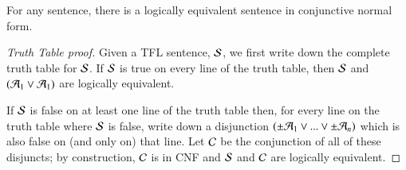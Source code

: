 \begin{theorem}
    For any sentence, there is a logically equivalent sentence in conjunctive normal form.
\end{theorem}
\begin{proof}[Truth Table proof]
    Given a TFL sentence, $\mathcal{S}$, we first write down the complete truth table for $\mathcal{S}$. If $\mathcal{S}$ is true on every line of the truth table, then $\mathcal{S}$ and $(\mathcal{A}_1\vee\mathcal{A}_1)$ are logically equivalent.

    If $\mathcal{S}$ is false on at least one line of the truth table then, for every line on the truth table where $\mathcal{S}$ is false, write down a disjunction $(\pm\mathcal{A}_1\vee...\vee\pm\mathcal{A}_n)$ which is also false on (and only on) that line. Let $\mathcal{C}$ be the conjunction of all of these disjuncts; by construction, $\mathcal{C}$ is in CNF and $\mathcal{S}$ and $\mathcal{C}$ are logically equivalent.
\end{proof}
